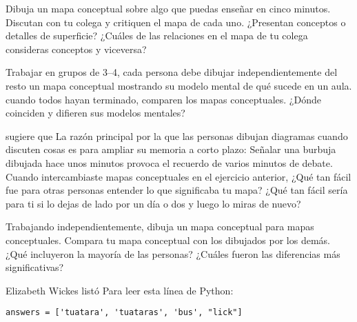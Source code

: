 

Dibuja un mapa conceptual sobre algo que puedas enseñar en cinco minutos.
Discutan con tu colega y critiquen el mapa de cada uno.
¿Presentan conceptos o detalles de superficie?
¿Cuáles de las relaciones en el mapa de tu colega consideras conceptos y viceversa?


Trabajar en grupos de 3--4,
cada persona debe dibujar independientemente del resto un mapa conceptual mostrando su modelo mental de qué sucede en un aula.
cuando todos hayan terminado,
comparen los mapas conceptuales.
¿Dónde coinciden y difieren sus modelos mentales?


\cite{Cher2007} sugiere que
La razón principal por la que las personas dibujan diagramas cuando discuten cosas
es para ampliar su memoria a corto plazo:
Señalar una burbuja dibujada hace unos minutos provoca el recuerdo de varios minutos de debate.
Cuando intercambiaste mapas conceptuales en el ejercicio anterior,
¿Qué tan fácil fue para otras personas entender lo que significaba tu mapa?
¿Qué tan fácil sería para ti si lo dejas de lado por un día o dos y luego lo miras de nuevo?


Trabajando independientemente,
dibuja un mapa conceptual para mapas conceptuales.
Compara tu mapa conceptual con los dibujados por los demás.
¿Qué incluyeron la mayoría de las personas?
¿Cuáles fueron las diferencias más significativas?


Elizabeth Wickes listó
Para leer esta línea de Python:

\begin{verbatim}
answers = ['tuatara', 'tuataras', 'bus', "lick"]
\end{verbatim}

